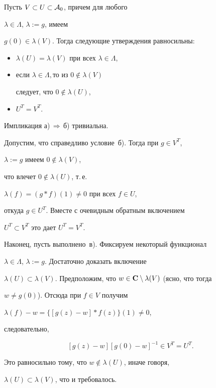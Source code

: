 \begin{lem}


Пусть $V \subset U \subset{\cal A}_0$, причем для любого 


$\lambda \in \Lambda$, $\lambda :=g$, имеем


$g(0) \in \lambda (V)$. Тогда следующие утверждения равносильны:


\begin{itemize}


\item[a)] $\lambda (U)= \lambda (V)$ при всех $\lambda \in \Lambda$,


\item[б)] если $\lambda \in \Lambda, $то из $0 \notin \lambda (V)$ 


следует, что $0 \notin \lambda (U)$,


\item[в)] $U^T =V^T$.


\end{itemize}


\end{lem}





\begin{pf}


Импликация а)\,$\Rightarrow$\,б) тривиальна. 


Допустим, что справедливо условие~б). Тогда при $g \in V^T$, 


$\lambda:=g$ имеем $0 \notin \lambda(V)$, 


что влечет $0\notin\lambda(U)$, т.\,е.


$\lambda(f) = (g*f)(1) \neq 0$ при всех $f \in U$,


откуда $g\in U^T$. Вместе с очевидным обратным включением 


$U^T \subset V^T$ это дает $U^T = V^T$. 


Наконец, пусть выполнено~в). Фиксируем некоторый функционал


$\lambda \in \Lambda$, $\lambda:=g$. Достаточно доказать включение 


$\lambda(U) \subset \lambda(V)$. Предположим, что $w\in 


\bold C \setminus \lambda(V)$ (ясно, что тогда 


$w \neq g(0)$). Отсюда при $f\in V$ получим 


$\lambda(f)-w = \{ [g(z)-w]*f(z) \}(1) \neq 0$, 


следовательно,


\begin{equation}


[g(z)-w][g(0)-w]^{-1} \in V^T = U^T.


\end{equation}


Это равносильно тому, что $w \notin \lambda(U)$, иначе говоря, 


$\lambda(U) \subset \lambda(V)$, что и требовалось.


\end{pf}






